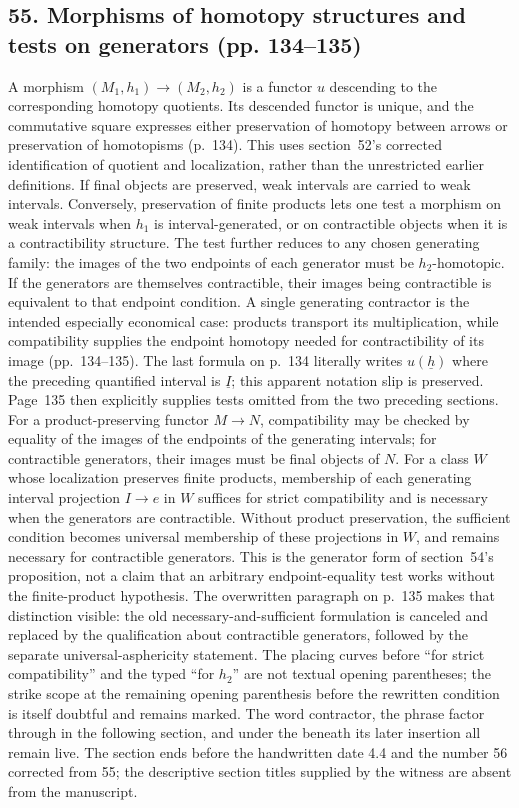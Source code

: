 \subsection*{55. Morphisms of homotopy structures and tests on generators (pp. 134--135)}
A morphism $(M_1,h_1)\to(M_2,h_2)$ is a functor $u$ descending to the corresponding homotopy quotients. Its descended functor is unique, and the commutative square expresses either preservation of homotopy between arrows or preservation of homotopisms (p.~134). This uses section~52's corrected identification of quotient and localization, rather than the unrestricted earlier definitions. If final objects are preserved, weak intervals are carried to weak intervals. Conversely, preservation of finite products lets one test a morphism on weak intervals when $h_1$ is interval-generated, or on contractible objects when it is a contractibility structure. The test further reduces to any chosen generating family: the images of the two endpoints of each generator must be $h_2$-homotopic. If the generators are themselves contractible, their images being contractible is equivalent to that endpoint condition. A single generating contractor is the intended especially economical case: products transport its multiplication, while compatibility supplies the endpoint homotopy needed for contractibility of its image (pp.~134--135). The last formula on p.~134 literally writes $u(\underline h)$ where the preceding quantified interval is $\underline I$; this apparent notation slip is preserved. Page~135 then explicitly supplies tests omitted from the two preceding sections. For a product-preserving functor $M\to N$, compatibility may be checked by equality of the images of the endpoints of the generating intervals; for contractible generators, their images must be final objects of $N$. For a class $W$ whose localization preserves finite products, membership of each generating interval projection $I\to e$ in $W$ suffices for strict compatibility and is necessary when the generators are contractible. Without product preservation, the sufficient condition becomes universal membership of these projections in $W$, and remains necessary for contractible generators. This is the generator form of section~54's proposition, not a claim that an arbitrary endpoint-equality test works without the finite-product hypothesis. The overwritten paragraph on p.~135 makes that distinction visible: the old necessary-and-sufficient formulation is canceled and replaced by the qualification about contractible generators, followed by the separate universal-asphericity statement. The placing curves before ``for strict compatibility'' and the typed ``for $h_2$'' are not textual opening parentheses; the strike scope at the remaining opening parenthesis before the rewritten condition is itself doubtful and remains marked. The word contractor, the phrase factor through in the following section, and under the beneath its later insertion all remain live. The section ends before the handwritten date 4.4 and the number 56 corrected from 55; the descriptive section titles supplied by the witness are absent from the manuscript.

